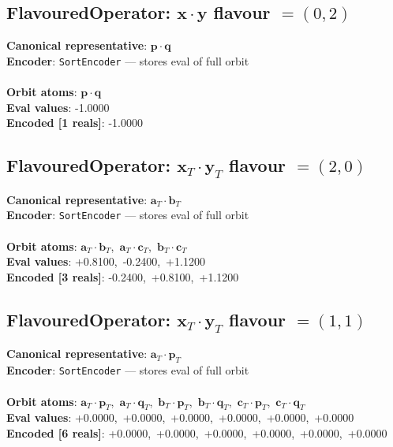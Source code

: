 \documentclass[a4paper,11pt]{article}
\newcommand{\pdcegfomjfhook}[2]{\mathbf{#1} \cdot \mathbf{#2}}
\newcommand{\fpbeomcfokjooi}[2]{\mathbf{#1}_T \cdot \mathbf{#2}_T}
\begin{document}
\subsection{FlavouredOperator: $\pdcegfomjfhook{x}{y}$  flavour $= (0, 2)$}
\textbf{  Canonical representative}: $\displaystyle\pdcegfomjfhook{p}{q}$\\
\textbf{  Encoder}: \texttt{SortEncoder} — stores eval of full orbit\\\\
\textbf{  Orbit atoms}: $\pdcegfomjfhook{p}{q}$\\
\textbf{  Eval values}: -1.0000\\
\textbf{  Encoded [1 reals]}: -1.0000\\

\subsection{FlavouredOperator: $\fpbeomcfokjooi{x}{y}$  flavour $= (2, 0)$}
\textbf{  Canonical representative}: $\displaystyle\fpbeomcfokjooi{a}{b}$\\
\textbf{  Encoder}: \texttt{SortEncoder} — stores eval of full orbit\\\\
\textbf{  Orbit atoms}: $\fpbeomcfokjooi{a}{b}$,\ $\fpbeomcfokjooi{a}{c}$,\ $\fpbeomcfokjooi{b}{c}$\\
\textbf{  Eval values}: +0.8100,\ -0.2400,\ +1.1200\\
\textbf{  Encoded [3 reals]}: -0.2400,\ +0.8100,\ +1.1200\\

\subsection{FlavouredOperator: $\fpbeomcfokjooi{x}{y}$  flavour $= (1, 1)$}
\textbf{  Canonical representative}: $\displaystyle\fpbeomcfokjooi{a}{p}$\\
\textbf{  Encoder}: \texttt{SortEncoder} — stores eval of full orbit\\\\
\textbf{  Orbit atoms}: $\fpbeomcfokjooi{a}{p}$,\ $\fpbeomcfokjooi{a}{q}$,\ $\fpbeomcfokjooi{b}{p}$,\ $\fpbeomcfokjooi{b}{q}$,\ $\fpbeomcfokjooi{c}{p}$,\ $\fpbeomcfokjooi{c}{q}$\\
\textbf{  Eval values}: +0.0000,\ +0.0000,\ +0.0000,\ +0.0000,\ +0.0000,\ +0.0000\\
\textbf{  Encoded [6 reals]}: +0.0000,\ +0.0000,\ +0.0000,\ +0.0000,\ +0.0000,\ +0.0000\\
\end{document}
